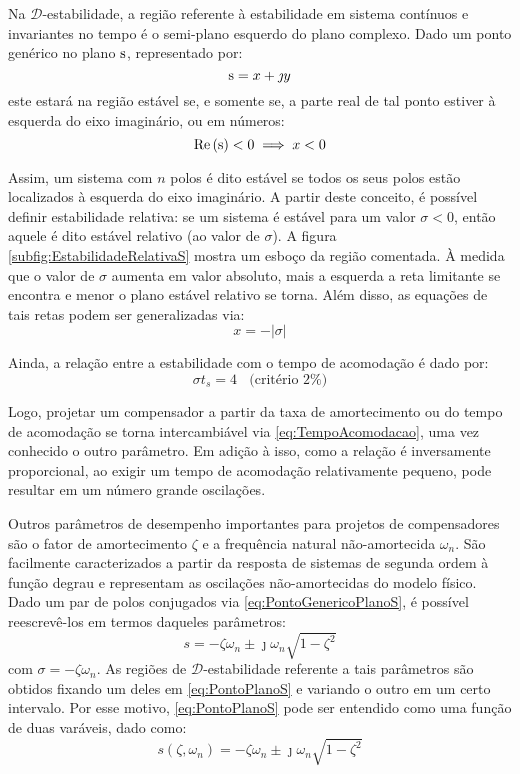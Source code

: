 Na $\mathscr{D}$-estabilidade, a região referente à estabilidade em sistema contínuos e invariantes no tempo é o semi-plano esquerdo do plano complexo. Dado um ponto genérico no plano $\operatorname{\mathrm{s}}$, representado por:
\begin{equation}
  \operatorname{\mathrm{s}} = x + \jmath y\label{eq:PontoGenericoPlanoS}
\end{equation}
este estará na região estável se, e somente se, a parte real de tal ponto estiver à esquerda do eixo imaginário, ou em números:
\begin{equation}
  \operatorname{Re}{(\operatorname{\mathrm{s}})} < 0 \implies x < 0 \label{eq:Estabilidade}
\end{equation}

Assim, um sistema com $n$ polos é dito estável se todos os seus polos estão localizados à esquerda do eixo imaginário. A partir deste conceito, é possível definir estabilidade relativa: se um sistema é estável para um valor $\sigma < 0$, então aquele é dito estável relativo (ao valor de $\sigma$). A figura \ref{subfig:EstabilidadeRelativaS} mostra um esboço da região comentada. À medida que o valor de $\sigma$ aumenta em valor absoluto, mais a esquerda a reta limitante se encontra e menor o plano estável relativo se torna. Além disso, as equações de tais retas podem ser generalizadas via:
\begin{equation}
  x = -|\sigma|\label{eq:Sigma}
\end{equation}

Ainda, a relação entre a estabilidade com o tempo de acomodação é dado por:
\begin{equation}
	\sigma t_s = 4 \,\,\,\,\ \text{(critério 2\%)}\label{eq:TempoAcomodacao}
\end{equation}

Logo, projetar um compensador a partir da taxa de amortecimento ou do tempo de acomodação se torna intercambiável via \eqref{eq:TempoAcomodacao}, uma vez conhecido o outro parâmetro. Em adição à isso, como a relação é inversamente proporcional, ao exigir um tempo de acomodação relativamente pequeno, pode resultar em um número grande oscilações.

Outros parâmetros de desempenho importantes para projetos de compensadores são o fator de amortecimento $\zeta$ e a frequência natural não-amortecida $\omega_n$. São facilmente caracterizados a partir da resposta de sistemas de segunda ordem à função degrau\cite{NISE2011,OGATA2011} e representam as oscilações não-amortecidas do modelo físico. Dado um par de polos conjugados via \eqref{eq:PontoGenericoPlanoS}, é possível reescrevê-los em termos daqueles parâmetros:
\begin{equation}
  s = -\zeta\omega_n \pm \jmath\omega_n \sqrt {1-\zeta^2} \label{eq:PontoPlanoS}
\end{equation}
com $\sigma = -\zeta\omega_n$. As regiões de $\mathscr{D}$-estabilidade referente a tais parâmetros são obtidos fixando um deles em \eqref{eq:PontoPlanoS} e variando o outro em um certo intervalo. Por esse motivo, \eqref{eq:PontoPlanoS} pode ser entendido como uma função de duas varáveis, dado como:
\begin{equation}
  s(\zeta,\omega_n) = -\zeta\omega_n \pm \jmath\omega_n \sqrt {1-\zeta^2} \label{eq:FuncaoPontoPlanoS}
\end{equation}

